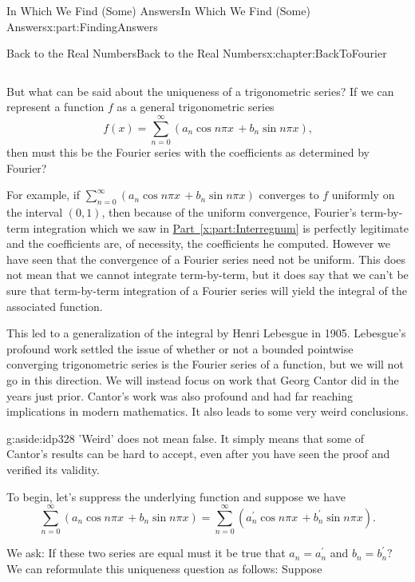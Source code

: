 \documentclass[oneside,10pt,]{book}
\newcommand{\xreffont}{\relax}
\numberwithin{equation}{section}
\begin{document}
\begin{partptx}{In Which We Find (Some) Answers}{}{In Which We Find (Some) Answers}{}{}{x:part:FindingAnswers}
\begin{chapterptx}{Back to the Real Numbers}{}{Back to the Real Numbers}{}{}{x:chapter:BackToFourier}
\begin{introduction}{}
\begin{equation*}
\end{equation*}
%
\par
But what can be said about the uniqueness of a trigonometric series? If we can represent a function \(f\) as a general trigonometric series%
\begin{equation*}
f(x)=\sum_{n=0}^\infty(a_n\cos n\pi x\,+b_n\sin n\pi x)\text{,}
\end{equation*}
then must this be the Fourier series with the coefficients as determined by Fourier? %
\par
For example, if \(\sum_{n=0}^\infty(a_n\cos n\pi x\,+b_n\sin n\pi x)\) converges to \(f\) uniformly on the interval \((0,1)\), then because of the uniform convergence, Fourier's term-by-term integration which we saw in \hyperref[x:part:Interregnum]{Part~{\xreffont\ref{x:part:Interregnum}}} is perfectly legitimate and the coefficients are, of necessity, the coefficients he computed. However we have seen that the convergence of a Fourier series need not be uniform. This does not mean that we cannot integrate term-by-term, but it does say that we can't be sure that term-by-term integration of a Fourier series will yield the integral of the associated function.%
\par
{} This led to a generalization of the integral by Henri Lebesgue in 1905.  Lebesgue's profound work settled the issue of whether or not a bounded pointwise converging trigonometric series is the Fourier series of a function, but we will not go in this direction.  We will instead focus on work that Georg Cantor did in the years just prior. Cantor's work was also profound and had far reaching implications in modern mathematics.  It also leads to some very weird conclusions.%
\begin{aside}{}{g:aside:idp328}%
'Weird' does not mean false.  It simply means that some of Cantor's results can be hard to accept, even after you have seen the proof and verified its validity.%
\end{aside}
To begin, let's suppress the underlying function and suppose we have%
\begin{equation*}
\sum_{n=0}^\infty(a_n\cos n\pi x\,+b_n\sin n\pi x) = \sum_{n=0}^\infty(a^\prime_n\cos n\pi x\,+b^\prime_n\sin n\pi x)\text{.}
\end{equation*}
%
\par
We ask: If these two series are equal must it be true that \(a_n=a^\prime_n\) and \(b_n=b^\prime_n?\) We can reformulate this uniqueness question as follows: Suppose%

\end{introduction}
\end{chapterptx}
\end{partptx}
\end{document}

